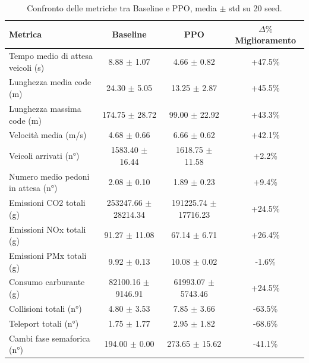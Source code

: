 \begin{table}[ht]
\centering
\caption{Confronto delle metriche tra Baseline e PPO, media $\pm$ std su 20 seed.}
\label{tab:final_comparison}
\begin{tabular}{lccc}
\toprule
\textbf{Metrica} & \textbf{Baseline} & \textbf{PPO} & \textbf{$\Delta\%$ Miglioramento} \\
\midrule
Tempo medio di attesa veicoli (s) & 8.88 $\pm$ 1.07 & 4.66 $\pm$ 0.82 & +47.5\% \\
Lunghezza media code (m) & 24.30 $\pm$ 5.05 & 13.25 $\pm$ 2.87 & +45.5\% \\
Lunghezza massima code (m) & 174.75 $\pm$ 28.72 & 99.00 $\pm$ 22.92 & +43.3\% \\
Velocità media (m/s) & 4.68 $\pm$ 0.66 & 6.66 $\pm$ 0.62 & +42.1\% \\
Veicoli arrivati (n°) & 1583.40 $\pm$ 16.44 & 1618.75 $\pm$ 11.58 & +2.2\% \\
Numero medio pedoni in attesa (n°) & 2.08 $\pm$ 0.10 & 1.89 $\pm$ 0.23 & +9.4\% \\
Emissioni CO2 totali (g) & 253247.66 $\pm$ 28214.34 & 191225.74 $\pm$ 17716.23 & +24.5\% \\
Emissioni NOx totali (g) & 91.27 $\pm$ 11.08 & 67.14 $\pm$ 6.71 & +26.4\% \\
Emissioni PMx totali (g) & 9.92 $\pm$ 0.13 & 10.08 $\pm$ 0.02 & -1.6\% \\
Consumo carburante (g) & 82100.16 $\pm$ 9146.91 & 61993.07 $\pm$ 5743.46 & +24.5\% \\
Collisioni totali (n°) & 4.80 $\pm$ 3.53 & 7.85 $\pm$ 3.66 & -63.5\% \\
Teleport totali (n°) & 1.75 $\pm$ 1.77 & 2.95 $\pm$ 1.82 & -68.6\% \\
Cambi fase semaforica (n°) & 194.00 $\pm$ 0.00 & 273.65 $\pm$ 15.62 & -41.1\% \\
\bottomrule
\end{tabular}
\end{table}